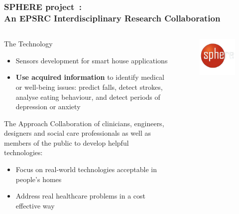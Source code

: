 \documentclass[10pt]{beamer}
\begin{document}
  \begin{frame}[plain]%
    \frametitle{SPHERE project~\cite{sphere}:\\An EPSRC Interdisciplinary Research Collaboration} %
    
      \begin{columns}

        \begin{column}{10cm}
          \begin{block}{The Technology}
            \begin{itemize}
              \item Sensors development for smart house applications
              \item \textbf{Use acquired information} to identify medical or well-being issues: predict falls, detect strokes, analyse eating behaviour, and detect periods of depression or anxiety
            \end{itemize}
          \end{block}
        \begin{block}{The Approach}
Collaboration of clinicians, engineers, designers and social care professionals as well as members of the public to develop helpful technologies:
        \begin{itemize}
          \item Focus on real-world technologies acceptable in people's homes
          \item Address real healthcare problems in a cost effective way
        \end{itemize}
      \end{block}
    \end{column}


        \begin{column}{1.5cm}
        \begin{figure}
          \includegraphics[scale=.13]{../bgSlides/gfx/sphere} 
        \end{figure}
        \end{column}


      \end{columns}
  \end{frame}
\end{document}
